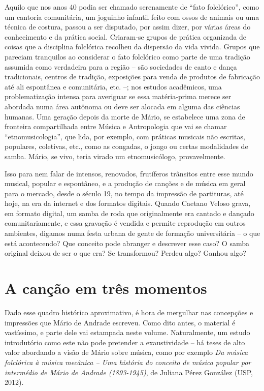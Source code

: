 Aquilo que nos anos 40 podia ser chamado serenamente de ``fato
folclórico'', como um cantoria comunitária, um joguinho infantil feito
com ossos de animais ou uma técnica de costura, passou a ser disputado,
por assim dizer, por várias áreas do conhecimento e da prática social.
Criaram-se grupos de prática organizada de coisas que a disciplina
folclórica recolheu da dispersão da vida vivida. Grupos que pareciam
tranquilos ao considerar o fato folclórico como parte de uma tradição
assumida como verdadeira para a região -- são sociedades de canto e
dança tradicionais, centros de tradição, exposições para venda de
produtos de fabricação até ali espontânea e comunitária, etc. --; nos
estudos acadêmicos, uma problematização intensa para averiguar se essa
matéria-prima merece ser abordada numa área autônoma ou deve ser alocada
em alguma das ciências humanas. Uma geração depois da morte de Mário, se
estabelece uma zona de fronteira compartilhada entre Música e
Antropologia que vai se chamar ``etnomusicologia'', que lida, por
exemplo, com práticas musicais não escritas, populares, coletivas, etc.,
como as congadas, o jongo ou certas modalidades de samba. Mário, se
vivo, teria virado um etnomusicólogo, provavelmente.

Isso para nem falar de intensos, renovados, frutíferos trânsitos entre
esse mundo musical, popular e espontâneo, e a produção de canções e de
música em geral para o mercado, desde o século 19, no tempo da impressão
de partituras, até hoje, na era da internet e dos formatos digitais.
Quando Caetano Veloso grava, em formato digital, um samba de roda que
originalmente era cantado e dançado comunitariamente, e essa gravação é
vendida e permite reprodução em outros ambientes, digamos numa festa
urbana de gente de formação universitária -- o que está acontecendo? Que
conceito pode abranger e descrever esse caso? O samba original deixou de
ser o que era? Se transformou? Perdeu algo? Ganhou algo?

\chapter{A canção em três momentos}

Dado esse quadro histórico aproximativo, é hora de mergulhar nas
concepções e impressões que Mário de Andrade escreveu. Como dito antes,
o material é vastíssimo, e parte dele vai estampada neste volume.
Naturalmente, um estudo introdutório como este não pode pretender a
exaustividade -- há teses de alto valor abordando a visão de Mário sobre
música, como por exemplo \emph{Da música folclórica à música mecânica --
Uma história do conceito de música popular por intermédio de Mário de
Andrade (1893-1945)}, de Juliana Pérez González (USP, 2012).

